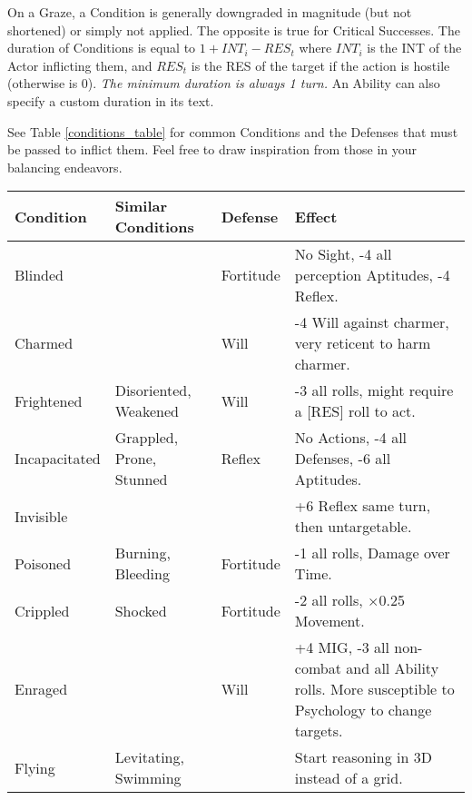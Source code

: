 On a Graze, a Condition is generally downgraded in magnitude (but not shortened) or simply not applied. The opposite is true for Critical Successes. The duration of Conditions is equal to $1+INT_i-RES_t$ where $INT_i$ is the INT of the Actor inflicting them, and $RES_t$ is the RES of the target if the action is hostile (otherwise is 0). \textit{The minimum duration is always 1 turn.} An Ability can also specify a custom duration in its text.

See Table \ref{conditions_table} for common Conditions and the Defenses that must be passed to inflict them. Feel free to draw inspiration from those in your balancing endeavors. 


\begin{table*}[h!tbp]
	\begin{center}
		\begin{tabular}{p{2.5cm}p{3.5cm}p{2cm}p{8cm}} \toprule
			
		    \textbf{Condition} & \textbf{Similar Conditions} & \textbf{Defense} & \textbf{Effect} \\ \midrule

		    Blinded & & Fortitude & No Sight, -4 all perception Aptitudes, -4 Reflex. \\[4mm] 
		    Charmed & & Will & -4 Will against charmer, very reticent to harm charmer. \\[4mm] 
		    Frightened & Disoriented, Weakened & Will & -3 all rolls, might require a [RES] roll to act. \\[4mm] 
            Incapacitated & Grappled, Prone, Stunned & Reflex & No Actions, -4 all Defenses, -6 all Aptitudes. \\[4mm]
			Invisible & & & +6 Reflex same turn, then untargetable. \\[4mm] 
            Poisoned & Burning, Bleeding & Fortitude & -1 all rolls, Damage over Time. \\[4mm] 
            Crippled & Shocked & Fortitude & -2 all rolls, $\times$0.25 Movement. \\[4mm] 
            Enraged & & Will & +4 MIG, -3 all non-combat and all Ability rolls. More susceptible to Psychology to change targets. \\[6mm] 
            Flying & Levitating, Swimming & & Start reasoning in 3D instead of a grid. \\[4mm] 

		    \bottomrule
		\end{tabular}
	\end{center}
	\caption{Conditions}
  \label{conditions_table}
\end{table*}

